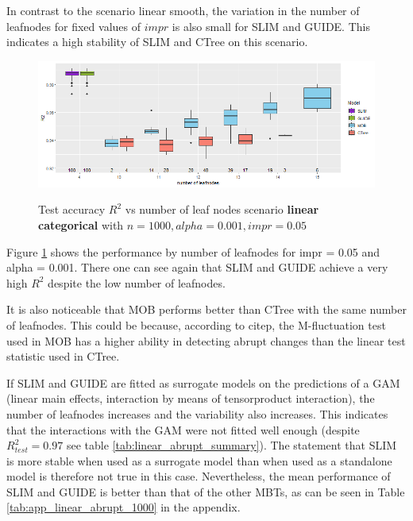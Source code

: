 In contrast to the scenario linear smooth, the variation in the number of leafnodes for fixed values of $impr$ is also small for SLIM and GUIDE. This indicates a high stability of SLIM and CTree on this scenario. 



\begin{figure}[!htb]
\caption{Test accuracy $R^2$ vs number of leaf nodes scenario \textbf{linear categorical} with $n=1000, alpha = 0.001, impr = 0.05$}
    \includegraphics[width=16cm]{Figures/simulations/batchtools/basic_scenarios/linear_abrupt/la_1000_standalone_r2_test.png}
    \label{fig:la_1000_standalone_r2_test}
\end{figure} 

Figure \ref{fig:la_1000_standalone_r2_test} shows the performance by number of leafnodes for impr = 0.05 and alpha = 0.001. There one can see again that SLIM and GUIDE achieve a very high $R^2$ despite the low number of leafnodes. 

It is also noticeable that MOB performs better than CTree with the same number of leafnodes.
This could be because, according to citep{\citep{Schlosser.2019}}, the M-fluctuation test used in MOB has a higher ability in detecting abrupt changes than the linear test statistic used in CTree.




If SLIM and GUIDE are fitted as surrogate models on the predictions of a GAM (linear main effects, interaction by means of tensorproduct interaction), the number of leafnodes increases and the variability also increases. This indicates that the interactions with the GAM were not fitted well enough (despite $R^2_{test} = 0.97$ see table \ref{tab:linear_abrupt_summary}). The statement that SLIM is more stable when used as a surrogate model than when used as a standalone model \citep{Hu.2020} is therefore not true in this case.
Nevertheless, the mean performance of SLIM and GUIDE is better than that of the other MBTs, as can be seen in Table \ref{tab:app_linear_abrupt_1000} in the appendix.




